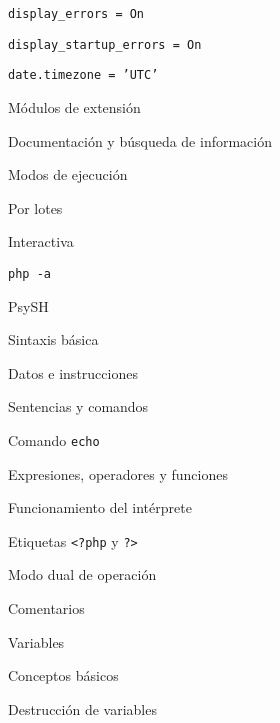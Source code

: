 \begin{longenum}
\begin{longenum}
\begin{longenum}
\begin{longenum}
                \item \texttt{display\_errors = On}
                \item \texttt{display\_startup\_errors = On}
                \item \texttt{date.timezone = 'UTC'}
            \end{longenum}
            \item Módulos de extensión
            \item Documentación y búsqueda de información
            \item Modos de ejecución
            \begin{longenum}
                \item Por lotes
                \item Interactiva
                \begin{longenum}
                    \item \texttt{php -a}
                    \item PsySH
                \end{longenum}
            \end{longenum}
        \end{longenum}
        \item Sintaxis básica
        \begin{longenum}
            \item Datos e instrucciones
            \item Sentencias y comandos
            \begin{longenum}
                \item Comando \texttt{echo}
            \end{longenum}
            \item Expresiones, operadores y funciones
        \end{longenum}
        \item Funcionamiento del intérprete
        \begin{longenum}
            \item Etiquetas \texttt{<?php} y \texttt{?>}
            \item Modo dual de operación
            \item Comentarios
        \end{longenum}
        \item Variables
        \begin{longenum}
            \item Conceptos básicos
            \item Destrucción de variables

\end{longenum}
\end{longenum}
\end{longenum}
